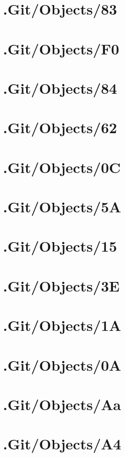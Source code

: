 \section*{.Git/Objects/83}

\section*{.Git/Objects/F0}

\section*{.Git/Objects/84}

\section*{.Git/Objects/62}

\section*{.Git/Objects/0C}

\section*{.Git/Objects/5A}

\section*{.Git/Objects/15}

\section*{.Git/Objects/3E}

\section*{.Git/Objects/1A}

\section*{.Git/Objects/0A}

\section*{.Git/Objects/Aa}

\section*{.Git/Objects/A4}

